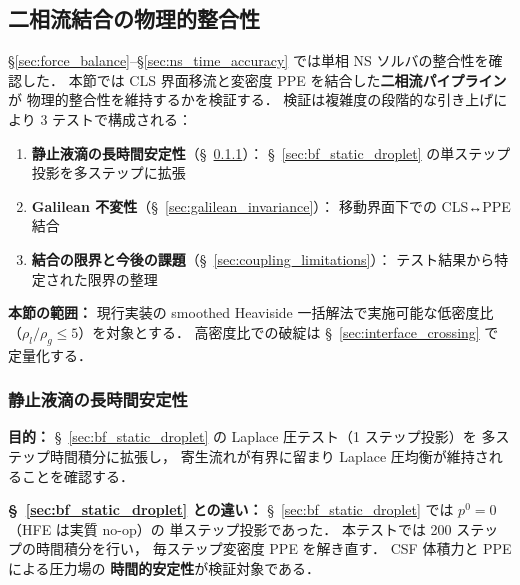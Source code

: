 %
\subsection{二相流結合の物理的整合性}
\label{sec:advection_pressure_coupling}

§\ref{sec:force_balance}--§\ref{sec:ns_time_accuracy} では単相 NS ソルバの整合性を確認した．
本節では CLS 界面移流と変密度 PPE を結合した\textbf{二相流パイプライン}が
物理的整合性を維持するかを検証する．
検証は複雑度の段階的な引き上げにより 3 テストで構成される：
\begin{enumerate}[noitemsep]
  \item \textbf{静止液滴の長時間安定性}（§~\ref{sec:twophase_static_longterm}）：
        §~\ref{sec:bf_static_droplet} の単ステップ投影を多ステップに拡張
  \item \textbf{Galilean 不変性}（§~\ref{sec:galilean_invariance}）：
        移動界面下での CLS↔PPE 結合
  \item \textbf{結合の限界と今後の課題}（§~\ref{sec:coupling_limitations}）：
        テスト結果から特定された限界の整理
\end{enumerate}

\noindent\textbf{本節の範囲：}
現行実装の smoothed Heaviside 一括解法で実施可能な低密度比
（$\rho_l/\rho_g \leq 5$）を対象とする．
高密度比での破綻は §~\ref{sec:interface_crossing} で定量化する．

\subsubsection{静止液滴の長時間安定性}
\label{sec:twophase_static_longterm}

\noindent\textbf{目的：}
§~\ref{sec:bf_static_droplet} の Laplace 圧テスト（1 ステップ投影）を
多ステップ時間積分に拡張し，
寄生流れが有界に留まり Laplace 圧均衡が維持されることを確認する．

\noindent\textbf{§~\ref{sec:bf_static_droplet} との違い：}
§~\ref{sec:bf_static_droplet} では $p^0 = 0$（HFE は実質 no-op）の
単ステップ投影であった．
本テストでは 200 ステップの時間積分を行い，
毎ステップ変密度 PPE を解き直す．
CSF 体積力と PPE による圧力場の
\textbf{時間的安定性}が検証対象である．

